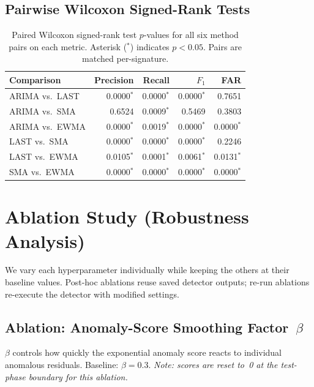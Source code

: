 \documentclass[11pt,a4paper]{article}
\begin{document}
\subsection{Pairwise Wilcoxon Signed-Rank Tests}

\begin{table}[H]
\centering
\caption{Paired Wilcoxon signed-rank test $p$-values for all six method
  pairs on each metric. Asterisk ($^{*}$) indicates $p < 0.05$.
  Pairs are matched per-signature.}
\label{tab:wilcoxon}
\begin{tabular}{lrrrr}
\toprule
Comparison & Precision & Recall & $F_1$ & FAR \\
\midrule
  ARIMA vs.\ LAST & 0.0000$^{*}$ & 0.0000$^{*}$ & 0.0000$^{*}$ & 0.7651 \\
  ARIMA vs.\ SMA & 0.6524 & 0.0009$^{*}$ & 0.5469 & 0.3803 \\
  ARIMA vs.\ EWMA & 0.0000$^{*}$ & 0.0019$^{*}$ & 0.0000$^{*}$ & 0.0000$^{*}$ \\
  LAST vs.\ SMA & 0.0000$^{*}$ & 0.0000$^{*}$ & 0.0000$^{*}$ & 0.2246 \\
  LAST vs.\ EWMA & 0.0105$^{*}$ & 0.0001$^{*}$ & 0.0061$^{*}$ & 0.0131$^{*}$ \\
  SMA vs.\ EWMA & 0.0000$^{*}$ & 0.0000$^{*}$ & 0.0000$^{*}$ & 0.0000$^{*}$ \\
\bottomrule
\end{tabular}
\end{table}


\section{Ablation Study (Robustness Analysis)}

We vary each hyperparameter individually while keeping the others at their
baseline values.  Post-hoc ablations reuse saved detector outputs; re-run
ablations re-execute the detector with modified settings.


\subsection{Ablation: Anomaly-Score Smoothing Factor~$\beta$}

$\beta$ controls how quickly the exponential anomaly score reacts to
individual anomalous residuals.  Baseline: $\beta = 0.3$.
\textit{Note: scores are reset to~0 at the test-phase boundary for this
ablation.}
\end{document}
